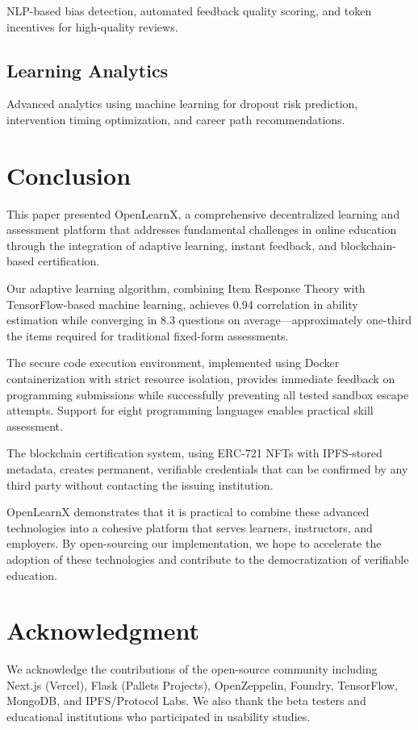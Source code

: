 \documentclass[conference]{IEEEtran}
\begin{document}
NLP-based bias detection, automated feedback quality scoring, and token incentives for high-quality reviews.

\subsection{Learning Analytics}

Advanced analytics using machine learning for dropout risk prediction, intervention timing optimization, and career path recommendations.

\section{Conclusion}

This paper presented OpenLearnX, a comprehensive decentralized learning and assessment platform that addresses fundamental challenges in online education through the integration of adaptive learning, instant feedback, and blockchain-based certification.

Our adaptive learning algorithm, combining Item Response Theory with TensorFlow-based machine learning, achieves 0.94 correlation in ability estimation while converging in 8.3 questions on average---approximately one-third the items required for traditional fixed-form assessments.

The secure code execution environment, implemented using Docker containerization with strict resource isolation, provides immediate feedback on programming submissions while successfully preventing all tested sandbox escape attempts. Support for eight programming languages enables practical skill assessment.

The blockchain certification system, using ERC-721 NFTs with IPFS-stored metadata, creates permanent, verifiable credentials that can be confirmed by any third party without contacting the issuing institution.

OpenLearnX demonstrates that it is practical to combine these advanced technologies into a cohesive platform that serves learners, instructors, and employers. By open-sourcing our implementation, we hope to accelerate the adoption of these technologies and contribute to the democratization of verifiable education.

\section*{Acknowledgment}

We acknowledge the contributions of the open-source community including Next.js (Vercel), Flask (Pallets Projects), OpenZeppelin, Foundry, TensorFlow, MongoDB, and IPFS/Protocol Labs. We also thank the beta testers and educational institutions who participated in usability studies.
\end{document}
